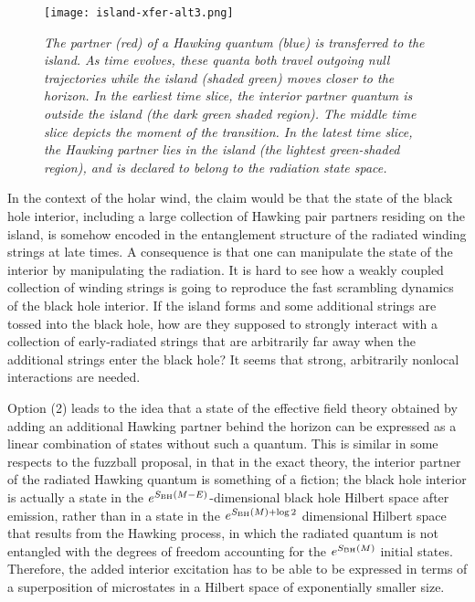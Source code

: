 \documentclass[11pt]{article}
\def\BH{{\rm BH}}
\numberwithin{equation}{section}
\begin{document}
\begin{figure}[ht]
%
\centering
    \texttt{[image: island-xfer-alt3.png]}
\caption{\it 
The partner (red) of a Hawking quantum (blue) is transferred to the island.  As time evolves, these quanta both travel outgoing null trajectories while the island (shaded green) moves closer to the horizon.  In the earliest time slice, the interior partner quantum is outside the island (the dark green shaded region).  The middle time slice depicts the moment of the transition.  In the latest time slice, the Hawking partner lies in the island (the lightest green-shaded region), and is declared to belong to the radiation state space.
}
\label{fig:island-xfer}
\end{figure}

In the context of the holar wind, the claim would be that the state of the black hole interior, including a large collection of Hawking pair partners residing on the island, is somehow encoded in the entanglement structure of the radiated winding strings at late times.
A consequence is that one can manipulate the state of the interior by manipulating the radiation.  It is hard to see how a weakly coupled collection of winding strings is going to reproduce the fast scrambling dynamics of the black hole interior.  If the island forms and some additional strings are tossed into the black hole, how are they supposed to strongly interact with a collection of early-radiated strings that are arbitrarily far away when the additional strings enter the black hole?  It seems that strong, arbitrarily nonlocal interactions are needed.



Option (2) leads to the idea that a state of the effective field theory obtained by adding an additional Hawking partner behind the horizon can be expressed as a linear combination of states without such a quantum.  This is similar in some respects to the fuzzball proposal, in that in the exact theory, the interior partner of the radiated Hawking quantum is something of a fiction; the black hole interior is actually a state in the $e^{S_\BH(M-E )}$-dimensional black hole Hilbert space after emission, rather than in a state in the $e^{S_\BH(M)+\log 2}$ dimensional Hilbert space that results from the Hawking process, in which the radiated quantum is not entangled with the degrees of freedom accounting for the $e^{S_\BH(M)}$ initial states.  Therefore, the added interior excitation has to be able to be expressed in terms of a superposition of microstates in a Hilbert space of exponentially smaller size.
\end{document}

